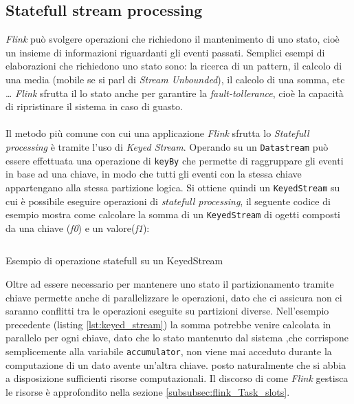 \subsection{Statefull stream processing}
\label{subsec:flink_statefull_processing}
\textit{Flink} può svolgere operazioni che richiedono il mantenimento di uno stato, cioè un insieme di informazioni riguardanti gli eventi passati.
Semplici esempi di elaborazioni che richiedono uno stato sono: la ricerca di un pattern, il calcolo di una media (mobile se si parl di \textit{Stream Unbounded}), il calcolo di una somma, etc \dots
\textit{Flink} sfrutta il lo stato anche per garantire la \textit{fault-tollerance}, cioè la capacità di ripristinare il sistema in caso di guasto.\\\\
Il metodo più comune con cui una applicazione \textit{Flink} sfrutta lo \textit{Statefull processing} è tramite l'uso di \textit{Keyed Stream}.
Operando su un \texttt{Datastream} può essere effettuata una operazione di \texttt{keyBy} che permette di raggruppare gli eventi in base ad una chiave,
in modo che tutti gli eventi con la stessa chiave appartengano alla stessa partizione logica.
Si ottiene quindi un \texttt{KeyedStream} su cui è possibile eseguire operazioni di \textit{statefull processing}, 
il seguente codice di esempio mostra come calcolare la somma di un \texttt{KeyedStream} di ogetti composti da una chiave (\textit{f0}) e un valore(\textit{f1}):

\begin{code}
    \inputminted{java}{listings/keyed-stream.java}
    \caption{Esempio di operazione statefull su un KeyedStream}
    \label{lst:keyed_stream}
\end{code}


Oltre ad essere necessario per mantenere uno stato il partizionamento tramite chiave permette anche di parallelizzare le operazioni, 
dato che ci assicura non ci saranno conflitti tra le operazioni eseguite su partizioni diverse.
Nell'esempio precedente (listing \ref{lst:keyed_stream}) la somma potrebbe venire calcolata in parallelo per ogni chiave, dato che lo stato mantenuto dal sistema
,che corrispone semplicemente alla variabile \texttt{accumulator}, non viene mai acceduto durante la computazione di un dato avente un'altra chiave.
posto naturalmente che si abbia a disposizione sufficienti risorse computazionali.
Il discorso di come \textit{Flink} gestisca le risorse è approfondito nella sezione \ref{subsubsec:flink_Task_slots}.

